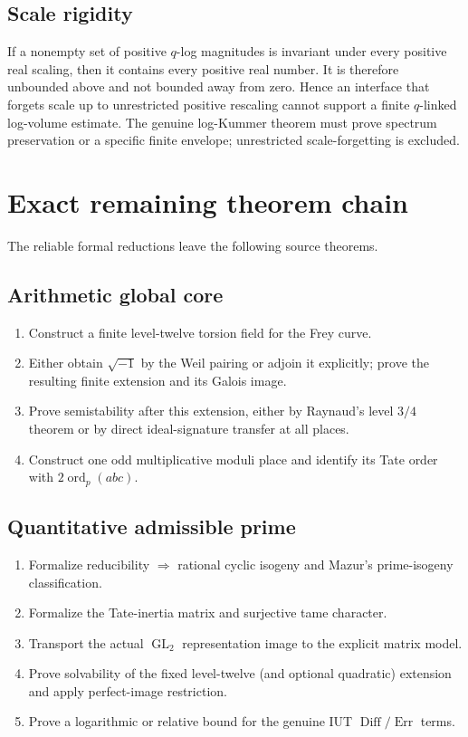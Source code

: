 \documentclass[11pt]{article}
\newcommand{\GL}{\operatorname{GL}}
\newcommand{\ord}{\operatorname{ord}}
\begin{document}
\subsection{Scale rigidity}
If a nonempty set of positive $q$-log magnitudes is invariant under every
positive real scaling, then it contains every positive real number.  It is
therefore unbounded above and not bounded away from zero.  Hence an interface
that forgets scale up to unrestricted positive rescaling cannot support a
finite $q$-linked log-volume estimate.  The genuine log-Kummer theorem must
prove spectrum preservation or a specific finite envelope; unrestricted
scale-forgetting is excluded.

\section{Exact remaining theorem chain}

The reliable formal reductions leave the following source theorems.

\subsection*{Arithmetic global core}
\begin{enumerate}[label=G\arabic*.]
\item Construct a finite level-twelve torsion field for the Frey curve.
\item Either obtain $\sqrt{-1}$ by the Weil pairing or adjoin it explicitly;
prove the resulting finite extension and its Galois image.
\item Prove semistability after this extension, either by Raynaud's level
$3/4$ theorem or by direct ideal-signature transfer at all places.
\item Construct one odd multiplicative moduli place and identify its Tate
order with $2\ord_p(abc)$.
\end{enumerate}

\subsection*{Quantitative admissible prime}
\begin{enumerate}[label=P\arabic*.]
\item Formalize reducibility $\Rightarrow$ rational cyclic isogeny and Mazur's
prime-isogeny classification.
\item Formalize the Tate-inertia matrix and surjective tame character.
\item Transport the actual $\GL_2$ representation image to the explicit
matrix model.
\item Prove solvability of the fixed level-twelve (and optional quadratic)
extension and apply perfect-image restriction.
\item Prove a logarithmic or relative bound for the genuine IUT
$\operatorname{Diff}/\operatorname{Err}$ terms.
\end{enumerate}
\end{document}
